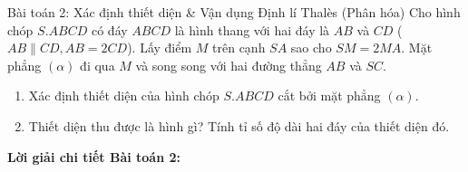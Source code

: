 \documentclass[12pt, a4paper]{article}
\begin{document}
\begin{pedabox}{Bài toán 2: Xác định thiết diện \& Vận dụng Định lí Thalès (Phân hóa)}
Cho hình chóp $S.ABCD$ có đáy $ABCD$ là hình thang với hai đáy là $AB$ và $CD$ ($AB \parallel CD, AB = 2CD$). Lấy điểm $M$ trên cạnh $SA$ sao cho $SM = 2MA$. Mặt phẳng $(\alpha)$ đi qua $M$ và song song với hai đường thẳng $AB$ và $SC$.
\begin{enumerate}[leftmargin=0.6cm]
    \item Xác định thiết diện của hình chóp $S.ABCD$ cắt bởi mặt phẳng $(\alpha)$.
    \item Thiết diện thu được là hình gì? Tính tỉ số độ dài hai đáy của thiết diện đó.
\end{enumerate}
\end{pedabox}

\textbf{Lời giải chi tiết Bài toán 2:}
\end{document}
